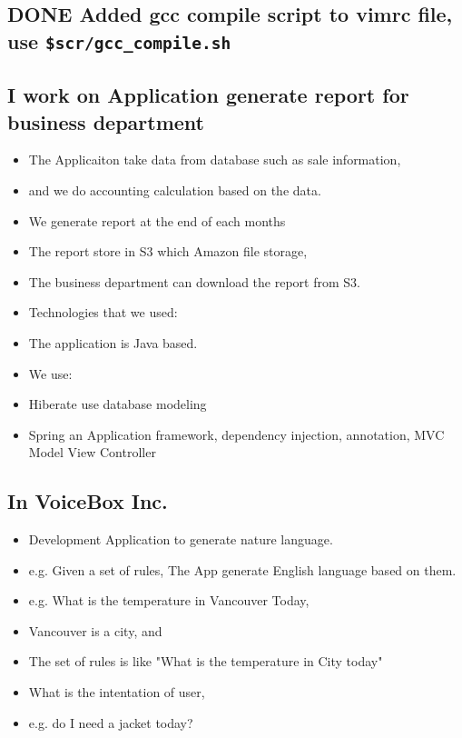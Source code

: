 \documentclass[11pt]{article}
\begin{document}
\subsection{{\bfseries\sffamily DONE} Added gcc compile script to vimrc file, use \texttt{\$scr/gcc\_compile.sh}}
\label{sec:org64be33c}

\subsection{I work on Application generate report for business department}
\label{sec:org6dd1615}
\begin{itemize}
\item The Applicaiton take data from database such as sale information,
\item and we do accounting calculation based on the data.
\item We generate report at the end of each months
\item The report store in S3 which Amazon file storage,
\item The business department can download the report from S3.
\item Technologies that we used:
\item The application is Java based.
\item We use:
\item Hiberate use database modeling
\item Spring an Application framework, dependency injection, annotation, MVC Model View Controller
\end{itemize}
\subsection{In VoiceBox Inc.}
\label{sec:orgc551150}
\begin{itemize}
\item Development Application to generate nature language.
\item e.g. Given a set of rules, The App generate English language based on them.
\item e.g. What is the temperature in Vancouver Today,
\item Vancouver is a city, and
\item The set of rules is like "What is the temperature in City today"
\item What is the intentation of user,
\item e.g. do I need a jacket today?
\end{itemize}
\end{document}
